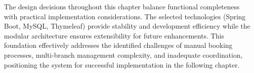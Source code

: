 The design decisions throughout this chapter balance functional completeness with practical implementation considerations. The selected technologies (Spring Boot, MySQL, Thymeleaf) provide stability and development efficiency while the modular architecture ensures extensibility for future enhancements. This foundation effectively addresses the identified challenges of manual booking processes, multi-branch management complexity, and inadequate coordination, positioning the system for successful implementation in the following chapter.
